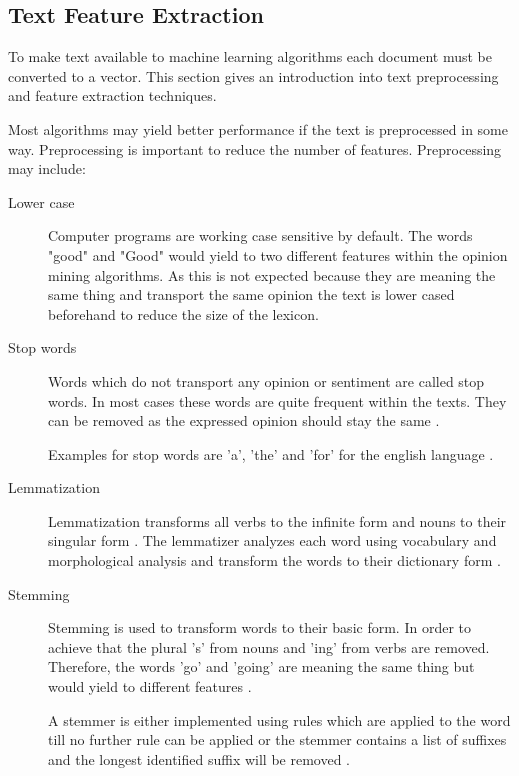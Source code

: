 \subsection{Text Feature Extraction}
\label{ss:background-optionmining-textfeatureextraction}

To make text available to machine learning algorithms each document must be converted to a vector.
This section gives an introduction into text preprocessing and feature extraction techniques.

Most algorithms may yield better performance if the text is preprocessed in some way.
Preprocessing is important to reduce the number of features. Preprocessing may include:

\begin{description}
	\item [Lower case]
		Computer programs are working case sensitive by default.
		The words "good" and "Good" would yield to two different features within the opinion mining algorithms.
		As this is not expected because they are meaning the same thing and transport the same opinion the text is lower cased beforehand to reduce the size of the lexicon.

	\item [Stop words]
		Words which do not transport any opinion or sentiment are called stop words.
		In most cases these words are quite frequent within the texts.
		They can be removed as the expressed opinion should stay the same
		\cite{Nothman2018}.

		Examples for stop words are 'a', 'the' and 'for' for the english language
		\cite{schumaker2009textual}.

	\item [Lemmatization]
		Lemmatization transforms all verbs to the infinite form and nouns to their singular form 
		\cite{Shukri2015a}.
		The lemmatizer analyzes each word using vocabulary and morphological analysis and transform the words to their dictionary form
		\cite{Balakrishnan2014}.
 
	\item [Stemming]
		Stemming is used to transform words to their basic form.
		In order to achieve that the plural 's' from nouns and 'ing' from verbs are removed.
		Therefore, the words 'go' and 'going' are meaning the same thing but would yield to different features
		\cite{Shukri2015a}.

		A stemmer is either implemented using rules which are applied to the word till no further rule can be applied or the stemmer contains a list of suffixes and the longest identified suffix will be removed
		\cite{Balakrishnan2014}.
\end{description}


